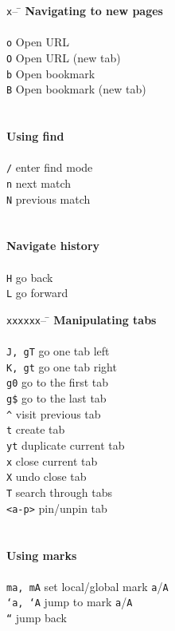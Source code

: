\documentclass{article}
\newcommand{\narrowtabhead}{\texttt{x}-- \= \kill}
\newcommand{\widetabhead}{\texttt{xxxxxx}-- \= \kill}
\begin{document}
\begin{multicols*}{4}
    \begin{tabbing}
      \narrowtabhead
      \textbf{Navigating to new pages} \\
      \\
      \texttt{o} \> Open URL \\
      \texttt{O} \> Open URL (new tab) \\
      \texttt{b} \> Open bookmark \\
      \texttt{B} \> Open bookmark (new tab) \\
      \\
      \\
      \textbf{Using find} \\
      \\
      \texttt{/} \> enter find mode \\
      \texttt{n} \> next match \\
      \texttt{N} \> previous match \\
      \\
      \\
      \textbf{Navigate history} \\
      \\
      \texttt{H} \> go back \\
      \texttt{L} \> go forward \\
    \end{tabbing}
    
    \columnbreak
    
    \begin{tabbing}
      \widetabhead
      \textbf{Manipulating tabs} \\
      \\
      \texttt{J, gT} \> go one tab left \\
      \texttt{K, gt} \> go one tab right \\
      \texttt{g0}    \> go to the first tab \\
      \texttt{g\$}   \> go to the last tab \\
      \texttt{\^}    \> visit previous tab \\
      \texttt{t}     \> create tab \\
      \texttt{yt}    \> duplicate current tab \\
      \texttt{x}     \> close current tab \\
      \texttt{X}     \> undo close tab \\
      \texttt{T}     \> search through tabs \\
      \texttt{<a-p>} \> pin/unpin tab \\
      \\
      \\
      \textbf{Using marks} \\
      \\
      \texttt{ma, mA} \> set local/global mark \texttt{a}/\texttt{A} \\
      \texttt{`a, `A} \> jump to mark \texttt{a}/\texttt{A} \\
      \texttt{``}     \> jump back \\
    \end{tabbing}
    

\end{multicols*}
\end{document}

